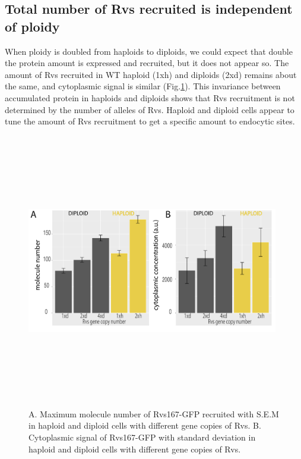 \subsection{Total number of Rvs recruited is independent of ploidy}
When ploidy is doubled from haploids to diploids, we could expect that double the protein amount is expressed and recruited, but it does not appear so. The amount of Rvs recruited in WT haploid (1xh) and diploids (2xd) remains about the same, and cytoplasmic signal is similar (Fig.\ref{disc_concentration}). This invariance between accumulated protein in haploids and diploids shows that Rvs recruitment is not determined by the number of alleles of Rvs. Haploid and diploid cells appear to tune the amount of Rvs recruitment to get a specific amount to endocytic sites.

	\begin{figure}[H]
	\centering
\includegraphics[width=11cm,height=12cm,keepaspectratio]{figures/discussion/number_comp}
	\caption[Recruitment of Rvs]
	{A. Maximum molecule number of Rvs167-GFP recruited with S.E.M in haploid and diploid cells with different gene copies of Rvs. 
	B. Cytoplasmic signal of Rvs167-GFP with standard deviation in haploid and diploid cells with different gene copies of Rvs. 
	\label{disc_concentration}}
	\end{figure}

